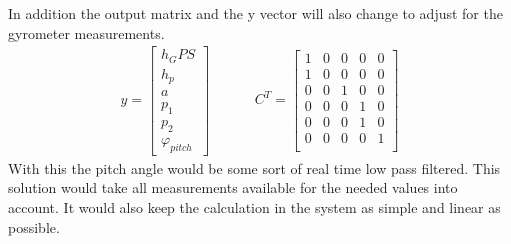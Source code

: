   In addition the output matrix and the y vector will also change to adjust for the gyrometer measurements.
  \begin{align*}
   y = \begin{bmatrix}
        h_GPS \\
        h_p \\
        a \\
        p_1\\
        p_2\\
        \varphi_{pitch}
       \end{bmatrix}
       & \hspace{1cm}
       C^T = \begin{bmatrix}
        1 & 0 & 0 & 0 & 0 \\
        1 & 0 & 0 & 0 & 0 \\
        0 & 0 & 1 & 0 & 0 \\
        0 & 0 & 0 & 1 & 0 \\
        0 & 0 & 0 & 1 & 0 \\
        0 & 0 & 0 & 0 & 1 \\
        \end{bmatrix}
  \end{align*}
  With this the pitch angle would be some sort of real time low pass filtered.
  This solution would take all measurements available for the needed values into account.
  It would also keep the calculation in the system as simple and linear as possible.
  
